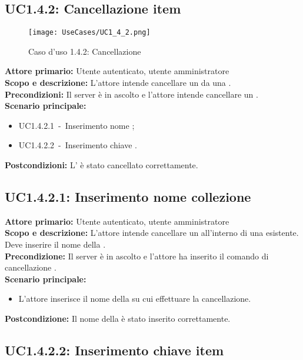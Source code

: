 \documentclass{scalatekids-article}
\begin{document}
\subsection{UC1.4.2: Cancellazione item}

\begin{figure}[H]
  \begin{center}
    \texttt{[image: UseCases/UC1\_4\_2.png]}
    \caption{Caso d'uso 1.4.2: Cancellazione }
  \end{center}
\end{figure}
\textbf{Attore primario:} Utente autenticato, utente amministratore\\
\textbf{Scopo e descrizione:} L'attore intende cancellare un  da una .\\
\textbf{Precondizioni:} Il server è in ascolto e l'attore intende cancellare un .\\
\textbf{Scenario principale:}
\begin{itemize}
\item UC1.4.2.1\ -\ Inserimento nome ;
\item UC1.4.2.2\ -\ Inserimento chiave .
\end{itemize}
\textbf{Postcondizioni:} L' è stato cancellato correttamente.

\subsection{UC1.4.2.1: Inserimento nome collezione}

\textbf{Attore primario:} Utente autenticato, utente amministratore\\
\textbf{Scopo e descrizione:} L'attore intende cancellare un  all'interno di una  esistente. Deve inserire il nome della .\\
\textbf{Precondizione:} Il server è in ascolto e l'attore ha inserito il comando di cancellazione .\\
\textbf{Scenario principale:}
\begin{itemize}
\item L'attore inserisce il nome della  su cui effettuare la cancellazione.
\end{itemize}
\textbf{Postcondizione:} Il nome della  è stato inserito correttamente.

\subsection{UC1.4.2.2: Inserimento chiave item}
\end{document}
